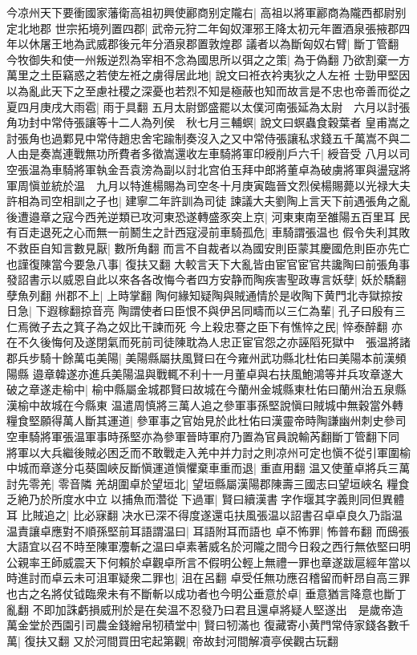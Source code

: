 今凉州天下要衝國家藩衛高祖初興使酈商别定隴右|{
	高祖以將軍酈商為隴西都尉别定北地郡}
世宗拓境列置四郡|{
	武帝元狩二年匈奴渾邪王降太初元年置酒泉張掖郡四年以休屠王地為武威郡後元年分酒泉郡置敦煌郡}
議者以為斷匈奴右臂|{
	斷丁管翻}
今牧御失和使一州叛逆烈為宰相不念為國思所以弭之之策|{
	為于偽翻}
乃欲割棄一方萬里之土臣竊惑之若使左袵之虜得居此地|{
	說文曰袵衣衿夷狄之人左袵}
士勁甲堅因以為亂此天下之至慮社稷之深憂也若烈不知是極蔽也知而故言是不忠也帝善而從之　夏四月庚戌大雨雹|{
	雨于具翻}
五月太尉鄧盛罷以太僕河南張延為太尉　六月以討張角功封中常侍張讓等十二人為列侯　秋七月三輔螟|{
	說文曰螟蟲食穀葉者}
皇甫嵩之討張角也過鄴見中常侍趙忠舍宅踰制奏沒入之又中常侍張讓私求錢五千萬嵩不與二人由是奏嵩連戰無功所費者多徵嵩還收左車騎將軍印綬削戶六千|{
	綬音受}
八月以司空張温為車騎將軍執金吾袁滂為副以討北宫伯玉拜中郎將董卓為破虜將軍與盪寇將軍周愼並統於温　九月以特進楊賜為司空冬十月庚寅臨晉文烈侯楊賜薨以光禄大夫許相為司空相訓之子也|{
	建寧二年許訓為司徒}
諫議大夫劉陶上言天下前遇張角之亂後遭邉章之寇今西羌逆類已攻河東恐遂轉盛豕突上京|{
	河東東南至雒陽五百里耳}
民有百走退死之心而無一前鬭生之計西寇浸前車騎孤危|{
	車騎謂張温也}
假令失利其敗不救臣自知言數見厭|{
	數所角翻}
而言不自裁者以為國安則臣蒙其慶國危則臣亦先亡也謹復陳當今要急八事|{
	復扶又翻}
大較言天下大亂皆由宦官宦官共讒陶曰前張角事發詔書示以威恩自此以來各各改悔今者四方安静而陶疾害聖政專言妖孽|{
	妖於驕翻孽魚列翻}
州郡不上|{
	上時掌翻}
陶何緣知疑陶與賊通情於是收陶下黄門北寺獄掠按日急|{
	下遐稼翻掠音亮}
陶謂使者曰臣恨不與伊呂同疇而以三仁為輩|{
	孔子曰殷有三仁焉微子去之箕子為之奴比干諫而死}
今上殺忠謇之臣下有憔悴之民|{
	悴泰醉翻}
亦在不久後悔何及遂閉氣而死前司徒陳耽為人忠正宦官怨之亦誣䧟死獄中　張温將諸郡兵步騎十餘萬屯美陽|{
	美陽縣屬扶風賢曰在今雍州武功縣北杜佑曰美陽本前漢頻陽縣}
邉章韓遂亦進兵美陽温與戰輒不利十一月董卓與右扶風鮑鴻等并兵攻章遂大破之章遂走榆中|{
	榆中縣屬金城郡賢曰故城在今蘭州金城縣東杜佑曰蘭州治五泉縣漢榆中故城在今縣東}
温遣周慎將三萬人追之參軍事孫堅說愼曰賊城中無穀當外轉糧食堅願得萬人斷其運道|{
	參軍事之官始見於此杜佑曰漢靈帝時陶謙幽州刺史參司空車騎將軍張温軍事時孫堅亦為參軍晉時軍府乃置為官員說輸芮翻斷丁管翻下同}
將軍以大兵繼後賊必困乏而不敢戰走入羌中并力討之則凉州可定也愼不從引軍圍榆中城而章遂分屯葵園峽反斷愼運道愼懼棄車重而退|{
	重直用翻}
温又使董卓將兵三萬討先零羌|{
	零音隣}
羌胡圍卓於望垣北|{
	望垣縣屬漢陽郡陳壽三國志曰望垣峽名}
糧食乏絶乃於所度水中立以捕魚而濳從下過軍|{
	賢曰續漢書字作堰其字義則同但異體耳}
比賊追之|{
	比必寐翻}
决水已深不得度遂還屯扶風張温以詔書召卓卓良久乃詣温温責讓卓應對不順孫堅前耳語謂温曰|{
	耳語附耳而語也}
卓不怖罪|{
	怖普布翻}
而䲭張大語宜以召不時至陳軍灋斬之温曰卓素著威名於河隴之間今日殺之西行無依堅曰明公親率王師威震天下何賴於卓觀卓所言不假明公輕上無禮一罪也章遂跋扈經年當以時進討而卓云未可沮軍疑衆二罪也|{
	沮在呂翻}
卓受任無功應召稽留而軒昂自高三罪也古之名將仗钺臨衆未有不斷斬以成功者也今明公垂意於卓|{
	垂意猶言降意也斷丁亂翻}
不即加誅虧損威刑於是在矣温不忍發乃曰君且還卓將疑人堅遂出　是歲帝造萬金堂於西園引司農金錢繒帛牣積堂中|{
	賢曰牣滿也}
復藏寄小黄門常侍家錢各數千萬|{
	復扶又翻}
又於河間買田宅起第觀|{
	帝故封河間解凟亭侯觀古玩翻}


